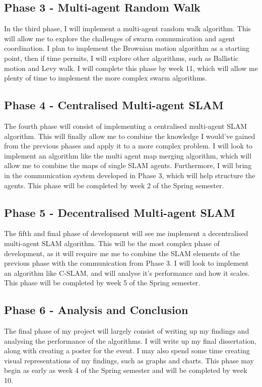\documentclass[12pt]{article}
\begin{document}
\subsection{Phase 3 - Multi-agent Random Walk}
In the third phase, I will implement a multi-agent random walk algorithm. This will allow me to explore the challenges of swarm
communication and agent coordination. I plan to implement the Brownian motion algorithm as a starting point, then if time permits,
I will explore other algorithms, such as Ballistic motion and Levy walk. I will complete this phase by week 11, which will allow me
plenty of time to implement the more complex swarm algorithms.
\subsection{Phase 4 - Centralised Multi-agent SLAM}
The fourth phase will consist of implementing a centralised multi-agent SLAM algorithm. This will finally allow me to combine
the knowledge I would've gained from the previous phases and apply it to a more complex problem. I will look to implement an
algorithm like the multi agent map merging algorithm, which will allow me to combine the maps of single SLAM agents. Furthermore,
I will bring in the communication system developed in Phase 3, which will help structure the agents. This phase will be completed by
week 2 of the Spring semester.
\subsection{Phase 5 - Decentralised Multi-agent SLAM}
The fifth and final phase of development will see me implement a decentralised multi-agent SLAM algorithm. This will be the most
complex phase of development, as it will require me me to combine the SLAM elements of the previous phase with the communication
from Phase 3. I will look to implement an algorithm like C-SLAM, and will analyse it's performance and how it scales. This phase
will be completed by week 5 of the Spring semester.
\subsection{Phase 6 - Analysis and Conclusion}
The final phase of my project will largely consist of writing up my findings and analysing the performance of the algorithms. I will
write up my final dissertation, along with creating a poster for the event. I may also spend some time creating visual representations
of my findings, such as graphs and charts. This phase may begin as early as week 4 of the Spring semester and will be completed by
week 10.
\end{document}
